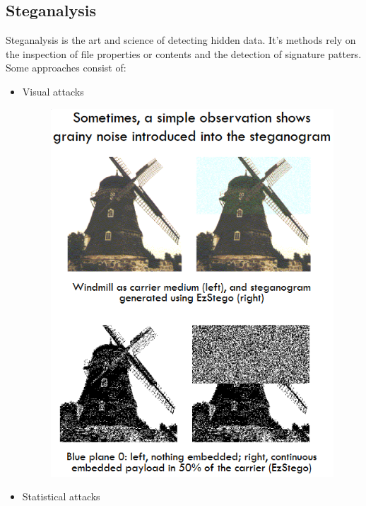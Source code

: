 \documentclass[10pt,a4paper]{report}
\begin{document}
\subsection{Steganalysis}
Steganalysis is the art and science of detecting hidden data. It's methods rely on the inspection of file properties or contents and the detection of signature patters. Some approaches consist of:
\begin{itemize}
\item Visual attacks
\begin{figure}[H]
\centering
\includegraphics[scale=0.4]{4.png}
\end{figure}
\item Statistical attacks
\begin{figure}[H]
\centering

\end{figure}
\end{itemize}
\end{document}
